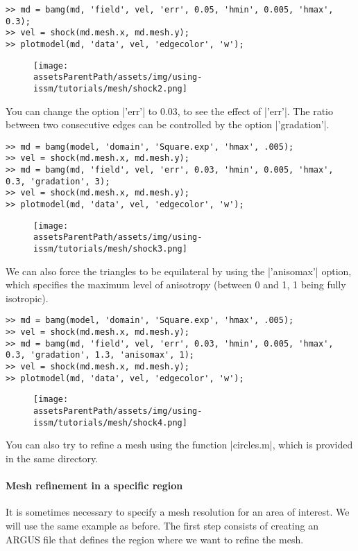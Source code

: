 \begin{lstlisting}
>> md = bamg(md, 'field', vel, 'err', 0.05, 'hmin', 0.005, 'hmax', 0.3);
>> vel = shock(md.mesh.x, md.mesh.y);
>> plotmodel(md, 'data', vel, 'edgecolor', 'w');
\end{lstlisting}
\begin{figure}[H]
	\begin{center}
		\texttt{[image: \\assetsParentPath/assets/img/using-issm/tutorials/mesh/shock2.png]}
	\end{center}
\end{figure}
You can change the option \lstinlinebg|'err'| to 0.03, to see the effect of \lstinlinebg|'err'|. The ratio between two consecutive edges can be controlled by the option \lstinlinebg|'gradation'|.
\begin{lstlisting}
>> md = bamg(model, 'domain', 'Square.exp', 'hmax', .005);
>> vel = shock(md.mesh.x, md.mesh.y);
>> md = bamg(md, 'field', vel, 'err', 0.03, 'hmin', 0.005, 'hmax', 0.3, 'gradation', 3);
>> vel = shock(md.mesh.x, md.mesh.y);
>> plotmodel(md, 'data', vel, 'edgecolor', 'w');
\end{lstlisting}
\begin{figure}[H]
	\begin{center}
		\texttt{[image: \\assetsParentPath/assets/img/using-issm/tutorials/mesh/shock3.png]}
	\end{center}
\end{figure}
We can also force the triangles to be equilateral by using the \lstinlinebg|'anisomax'| option, which specifies the maximum level of anisotropy (between 0 and 1, 1 being fully isotropic).
\begin{lstlisting}
>> md = bamg(model, 'domain', 'Square.exp', 'hmax', .005);
>> vel = shock(md.mesh.x, md.mesh.y);
>> md = bamg(md, 'field', vel, 'err', 0.03, 'hmin', 0.005, 'hmax', 0.3, 'gradation', 1.3, 'anisomax', 1);
>> vel = shock(md.mesh.x, md.mesh.y);
>> plotmodel(md, 'data', vel, 'edgecolor', 'w');
\end{lstlisting}
\begin{figure}[H]
	\begin{center}
		\texttt{[image: \\assetsParentPath/assets/img/using-issm/tutorials/mesh/shock4.png]}
	\end{center}
\end{figure}
You can also try to refine a mesh using the function \lstinlinebg|circles.m|, which is provided in the same directory.

\paragraph{Mesh refinement in a specific region}%
It is sometimes necessary to specify a mesh resolution for an area of interest. We will use the same example as before. The first step consists of creating an ARGUS file that defines the region where we want to refine the mesh.

